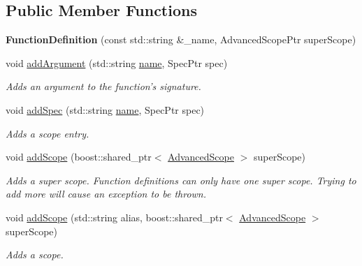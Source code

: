 \subsection*{Public Member Functions}
\begin{DoxyCompactItemize}
\item 
\hypertarget{classgiskard__suturo_1_1FunctionDefinition_ab054c457aedf56c7ed8dcd85a1bcccb6}{{\bfseries Function\-Definition} (const std\-::string \&\-\_\-name, Advanced\-Scope\-Ptr super\-Scope)}\label{classgiskard__suturo_1_1FunctionDefinition_ab054c457aedf56c7ed8dcd85a1bcccb6}

\item 
void \hyperlink{classgiskard__suturo_1_1FunctionDefinition_ac31bfbad951ac1334c8fe30807132dbe}{add\-Argument} (std\-::string \hyperlink{classgiskard__suturo_1_1FunctionDefinition_ab482fb6e6a9e27255e398c834d1bc813}{name}, Spec\-Ptr spec)
\begin{DoxyCompactList}\small\item\em Adds an argument to the function's signature. \end{DoxyCompactList}\item 
void \hyperlink{classgiskard__suturo_1_1FunctionDefinition_a723dc9bc2d5f964805dadc8af9a8c948}{add\-Spec} (std\-::string \hyperlink{classgiskard__suturo_1_1FunctionDefinition_ab482fb6e6a9e27255e398c834d1bc813}{name}, Spec\-Ptr spec)
\begin{DoxyCompactList}\small\item\em Adds a scope entry. \end{DoxyCompactList}\item 
void \hyperlink{classgiskard__suturo_1_1FunctionDefinition_a384541f47dac5c09c4c7a7e82bdb6820}{add\-Scope} (boost\-::shared\-\_\-ptr$<$ \hyperlink{classgiskard__suturo_1_1AdvancedScope}{Advanced\-Scope} $>$ super\-Scope)
\begin{DoxyCompactList}\small\item\em Adds a super scope. Function definitions can only have one super scope. Trying to add more will cause an exception to be thrown. \end{DoxyCompactList}\item 
void \hyperlink{classgiskard__suturo_1_1FunctionDefinition_a672efdf3e63b221f26ae2d2216d2ec1f}{add\-Scope} (std\-::string alias, boost\-::shared\-\_\-ptr$<$ \hyperlink{classgiskard__suturo_1_1AdvancedScope}{Advanced\-Scope} $>$ super\-Scope)
\begin{DoxyCompactList}\small\item\em Adds a scope. \end{DoxyCompactList}\item 

\end{DoxyCompactItemize}
